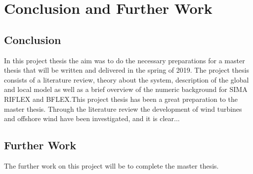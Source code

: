 \chapter{Conclusion and Further Work}
\label{chap:conclusion}
\section{Conclusion}
In this project thesis the aim was to do the necessary preparations for a master thesis that will be written and delivered in the spring of 2019. The project thesis consists of a literature review, theory about the system, description of the global and local model as well as a brief overview of the numeric background for SIMA RIFLEX and BFLEX.This project thesis has been a great preparation to the master thesis. Through the literature review the development of wind turbines and offshore wind have been investigated, and it is clear...

\section{Further Work}
The further work on this project will be to complete the master thesis. 